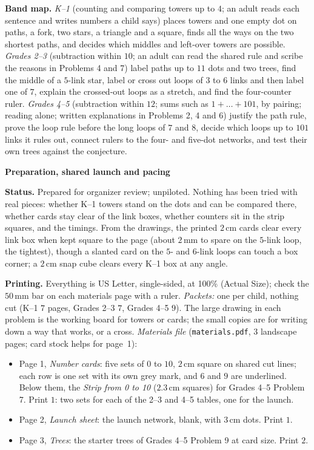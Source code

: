 \documentclass[11pt]{article}
\newcommand{\head}[1]{\par\textbf{\large #1}\par}
\begin{document}
\textbf{Band map.} \emph{K--1} (counting and comparing towers up to $4$; an adult reads each sentence and writes numbers a child says) places towers and one empty dot on paths, a fork, two stars, a triangle and a square, finds all the ways on the two shortest paths, and decides which middles and left-over towers are possible. \emph{Grades 2--3} (subtraction within $10$; an adult can read the shared rule and scribe the reasons in Problems 4 and 7) label paths up to $11$ dots and two trees, find the middle of a $5$-link star, label or cross out loops of $3$ to $6$ links and then label one of $7$, explain the crossed-out loops as a stretch, and find the four-counter ruler. \emph{Grades 4--5} (subtraction within $12$; sums such as $1+\dots+101$, by pairing; reading alone; written explanations in Problems 2, 4 and 6) justify the path rule, prove the loop rule before the long loops of $7$ and $8$, decide which loops up to $101$ links it rules out, connect rulers to the four- and five-dot networks, and test their own trees against the conjecture.
\head{Preparation, shared launch and pacing}
\textbf{Status.} Prepared for organizer review; unpiloted. Nothing has been tried with real pieces: whether K--1 towers stand on the dots and can be compared there, whether cards stay clear of the link boxes, whether counters sit in the strip squares, and the timings. From the drawings, the printed $2$\,cm cards clear every link box when kept square to the page (about $2$\,mm to spare on the $5$-link loop, the tightest), though a slanted card on the $5$- and $6$-link loops can touch a box corner; a $2$\,cm snap cube clears every K--1 box at any angle.

\textbf{Printing.} Everything is US Letter, single-sided, at 100\% (Actual Size); check the $50$\,mm bar on each materials page with a ruler. \emph{Packets:} one per child, nothing cut (K--1 $7$ pages, Grades 2--3 $7$, Grades 4--5 $9$). The large drawing in each problem is the working board for towers or cards; the small copies are for writing down a way that works, or a cross. \emph{Materials file} (\texttt{materials.pdf}, $3$ landscape pages; card stock helps for page~1):
\begin{itemize}
\item Page 1, \emph{Number cards}: five sets of $0$ to $10$, $2$\,cm square on shared cut lines; each row is one set with its own grey mark, and $6$ and $9$ are underlined. Below them, the \emph{Strip from 0 to 10} ($2.3$\,cm squares) for Grades 4--5 Problem 7. Print $1$: two sets for each of the 2--3 and 4--5 tables, one for the launch.
\item Page 2, \emph{Launch sheet}: the launch network, blank, with $3$\,cm dots. Print $1$.
\item Page 3, \emph{Trees}: the starter trees of Grades 4--5 Problem 9 at card size. Print $2$.
\end{itemize}
\end{document}
